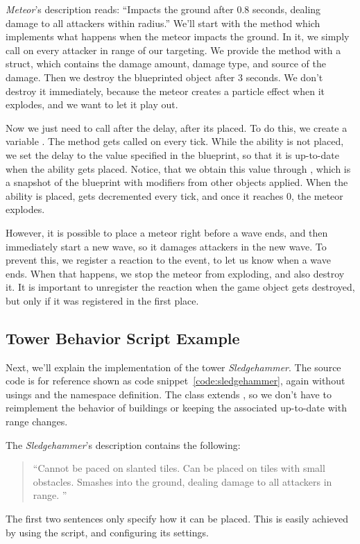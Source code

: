 \emph{Meteor}'s description reads: \enquote{Impacts the ground after 0.8 seconds, dealing damage to all attackers within radius.}
We'll start with the method  which implements what happens when the meteor impacts the ground.
In it, we simply call  on every attacker in range of our targeting.
We provide the method with a  struct, which contains the damage amount, damage type, and source of the damage.
Then we destroy the blueprinted object after 3 seconds.
We don't destroy it immediately, because the meteor creates a particle effect when it explodes, and we want to let it play out.

Now we just need to call  after the delay, after its placed.
To do this, we create a variable .
The method  gets called on every tick.
While the ability is not placed, we set the delay to the value specified in the blueprint, so that it is up-to-date when the ability gets placed.
Notice, that we obtain this value through , which is a snapshot of the blueprint with modifiers from other objects applied.
When the ability is placed,  gets decremented every tick, and once it reaches 0, the meteor explodes.

However, it is possible to place a meteor right before a wave ends, and then immediately start a new wave, so it damages attackers in the new wave.
To prevent this, we register a reaction to the  event, to let us know when a wave ends.
When that happens, we stop the meteor from exploding, and also destroy it.
It is important to unregister the reaction when the game object gets destroyed, but only if it was registered in the first place.

\subsection{Tower Behavior Script Example}\label{sec:docs-sledgehammer}

Next, we'll explain the implementation of the tower \emph{Sledgehammer}.
The source code is for reference shown as code snippet~\ref{code:sledgehammer}, again without usings and the namespace definition.
The  class extends , so we don't have to reimplement the behavior of buildings or keeping the associated  up-to-date with range changes.

The \emph{Sledgehammer}'s description contains the following:
\begin{quotation}
    \enquote{Cannot be paced on slanted tiles.
        Can be placed on tiles with small obstacles.
        Smashes into the ground, dealing damage to all attackers in range.    }
\end{quotation}
The first two sentences only specify how it can be placed.
This is easily achieved by using the  script, and configuring its settings.

